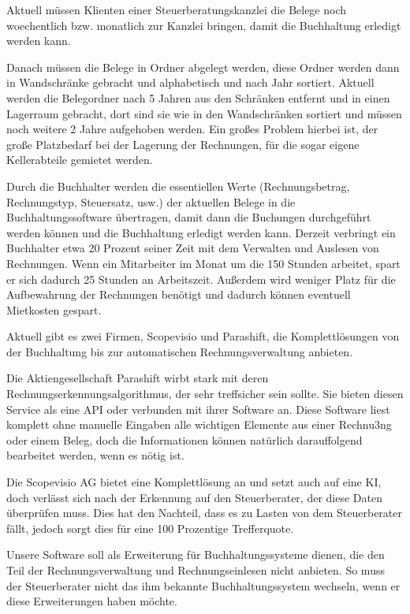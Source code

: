 \documentclass[12pt]{article}
\theoremstyle{definition}
\newcommand*{\skippingparagraph}{\par\vspace{\baselineskip}\noindent}
\begin{document}
Aktuell müssen Klienten einer Steuerberatungskanzlei die Belege noch woechentlich bzw. monatlich zur Kanzlei bringen, damit die Buchhaltung erledigt werden kann.
\skippingparagraph
Danach müssen die Belege in Ordner abgelegt werden, diese Ordner werden dann in Wandschränke gebracht und alphabetisch und nach Jahr sortiert. Aktuell werden die Belegordner nach 5 Jahren aus den Schränken entfernt und in einen Lagerraum gebracht, dort sind sie wie in den Wandschränken sortiert und müssen noch weitere 2 Jahre aufgehoben werden. Ein großes Problem hierbei ist, der große Platzbedarf bei der Lagerung der Rechnungen, für die sogar eigene Kellerabteile gemietet werden.
\skippingparagraph
Durch die Buchhalter werden die essentiellen Werte (Rechnungsbetrag, Rechnungstyp, Steuersatz, usw.) der aktuellen Belege in die Buchhaltungssoftware über\-tragen, damit dann die Buchungen durchgeführt werden können und die Buchhaltung erledigt werden kann.
Derzeit verbringt ein Buchhalter etwa 20 Prozent seiner Zeit mit dem Verwalten und Auslesen von Rechnungen. Wenn ein Mitarbeiter im Monat um die 150 Stunden arbeitet, spart er sich dadurch 25 Stunden an Arbeitszeit. Außerdem wird weniger Platz für die Aufbewahrung der Rechnungen benötigt und dadurch können eventuell Mietkosten gespart.
\skippingparagraph
Aktuell gibt es zwei Firmen, Scopevisio und Parashift, die Komplettlösungen von der Buchhaltung bis zur automatischen Rechnungsverwaltung anbieten.
\skippingparagraph
Die Aktiengesellschaft Parashift wirbt stark mit deren Rechnungserkennungsalgorithmus, der sehr treffsicher sein sollte. Sie bieten diesen Service als eine API oder verbunden mit ihrer Software an. Diese Software liest komplett ohne manuelle Eingaben alle wichtigen Elemente aus einer Rechnu3ng oder einem Beleg, doch die Informationen können natürlich darauffolgend bearbeitet werden, wenn es nötig ist.
\skippingparagraph
Die Scopevisio AG bietet eine Komplettlösung an und setzt auch auf eine KI, doch verlässt sich nach der Erkennung auf den Steuerberater, der diese Daten überprüfen muss. Dies hat den Nachteil, dass es zu Lasten von dem Steuerberater fällt, jedoch sorgt dies für eine 100 Prozentige Trefferquote.
\skippingparagraph
Unsere Software soll als Erweiterung für Buchhaltungssysteme dienen, die den Teil der Rechnungsverwaltung und Rechnungseinlesen nicht anbieten. So muss der Steuerberater nicht das ihm bekannte Buchhaltungssystem wechseln, wenn er diese Erweiterungen haben möchte.
\par
\pagebreak
\end{document}
